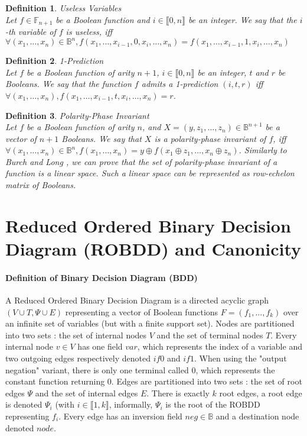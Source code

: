 \documentclass[a4paper,10pt]{article}
\newcommand{\B}{\mathbb{B}}
\newcommand{\F}{\mathbb{F}}
\newtheorem{newdef}{Definition}
\newcommand{\definition}[2]{\begin{newdef}{#1\\}#2\end{newdef}}
\begin{document}

\definition{Useless Variables}
{
Let $f\in\F_{n+1}$ be a Boolean function and $i\in\llbracket 0, n \rrbracket$ be an integer.
We say that the $i$-th variable of $f$ is useless, iff $\forall (x_1, \dots, x_n)\in\B^n, f(x_1, \dots, x_{i-1}, 0, x_i, \dots, x_n) = f(x_1, \dots, x_{i-1}, 1, x_i, \dots, x_n)$
}

\definition{1-Prediction}
{
Let $f$ be a Boolean function of arity $n+1$, $i\in\llbracket 0, n\rrbracket$ be an integer, $t$ and $r$ be Booleans.
We say that the function $f$ admits a 1-prediction $(i, t, r)$ iff $\forall (x_1, \dots, x_n), f(x_1, \dots, x_{i-1}, t, x_i, \dots, x_n) = r$.
}

\definition{Polarity-Phase Invariant}
{
Let $f$ be a Boolean function of arity $n$, and $X=(y, z_1, \dots, z_n)\in\B^{n+1}$ be a vector of $n+1$ Booleans.
We say that $X$ is a polarity-phase invariant of $f$, iff $\forall (x_1, \dots, x_n)\in\B^n, f(x_1, \dots, x_n) = y\oplus{}f(x_1\oplus{}z_1, \dots, x_n\oplus{}z_n)$.
Similarly to Burch and Long \cite{BurchLong1992}, we can prove that the set of polarity-phase invariant of a function is a linear space.
Such a linear space can be represented as row-echelon matrix of Booleans.
}

\section{Reduced Ordered Binary Decision Diagram (ROBDD) and Canonicity}

\paragraph{Definition of Binary Decision Diagram (BDD)\\}

A Reduced Ordered Binary Decision Diagram is a directed acyclic graph $(V\cup T, \Psi \cup E)$ representing a vector of Boolean functions $F=(f_1, ..., f_k)$ over an infinite set of variables (but with a finite support set).
Nodes are partitioned into two sets : the set of internal nodes $V$ and the set of terminal nodes $T$.
Every internal node $v\in V$ has one field $\mathit{var}$, which represents the index of a variable and two outgoing edges respectively denoted $\mathit{if0}$ and $\mathit{if1}$.
When using the "output negation" variant, there is only one terminal called 0, which represents the constant function returning 0.
Edges are partitioned into two sets : the set of root edges $\Psi$ and the set of internal edges $E$.
There is exactly $k$ root edges, a root edge is denoted $\Psi_i$ (with $i\in\llbracket 1, k \rrbracket$, informally, $\Psi_i$ is the root of the ROBDD representing $f_i$.
Every edge has an inversion field $neg \in \B$ and a destination node denoted $\mathit{node}$.
\end{document}
